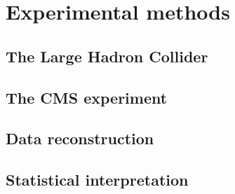 \chapter{Experimental methods}
\label{ch:methods}

\section{The Large Hadron Collider}

\section{The CMS experiment}

\section{Data reconstruction}
\label{sec:methods:reco}

\section{Statistical interpretation}

